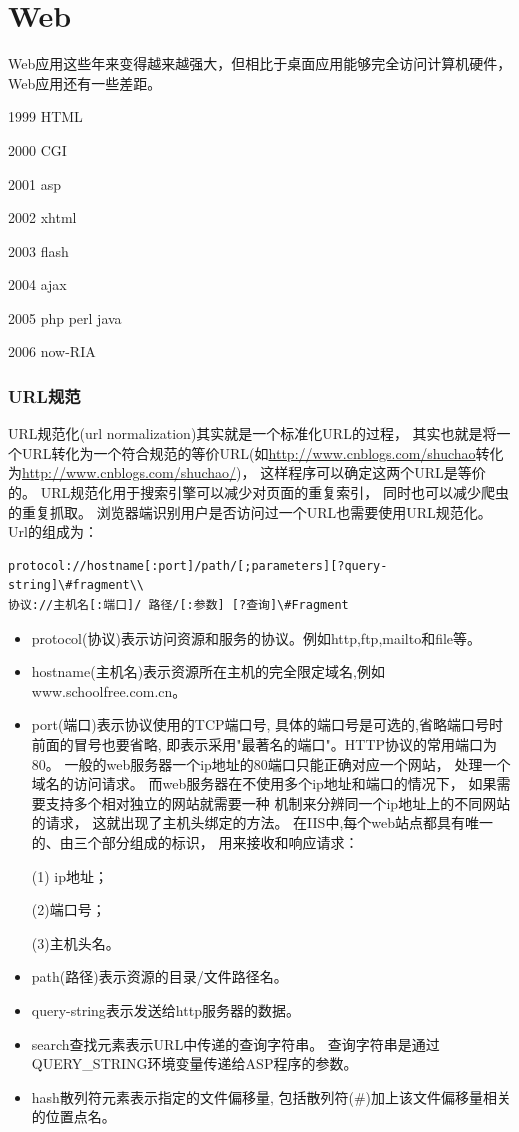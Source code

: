 \documentclass{book}
\begin{document}
\chapter{Web}

Web应用这些年来变得越来越强大，但相比于桌面应用能够完全访问计算机硬件，Web应用还有一些差距。

1999 HTML

2000 CGI

2001 asp

2002 xhtml

2003 flash

2004 ajax

2005 php perl java

2006 now-RIA

\clearpage
\mbox{}         
\clearpage

\subsection{URL规范}

URL规范化(url normalization)其实就是一个标准化URL的过程，
其实也就是将一个URL转化为一个符合规范的等价URL(如\url{http://www.cnblogs.com/shuchao}转化为\url{http://www.cnblogs.com/shuchao/})，
这样程序可以确定这两个URL是等价的。
URL规范化用于搜索引擎可以减少对页面的重复索引，
同时也可以减少爬虫的重复抓取。
浏览器端识别用户是否访问过一个URL也需要使用URL规范化。
Url的组成为：

\begin{lstlisting}
protocol://hostname[:port]/path/[;parameters][?query-string]\#fragment\\
协议://主机名[:端口]/ 路径/[:参数] [?查询]\#Fragment
\end{lstlisting}

\begin{itemize}
\item{protocol(协议)表示访问资源和服务的协议。例如http,ftp,mailto和file等。}
\item{hostname(主机名)表示资源所在主机的完全限定域名,例如www.schoolfree.com.cn。}
\item{port(端口)表示协议使用的TCP端口号,
具体的端口号是可选的,省略端口号时前面的冒号也要省略,
即表示采用"最著名的端口"。HTTP协议的常用端口为80。
一般的web服务器一个ip地址的80端口只能正确对应一个网站，
处理一个域名的访问请求。
而web服务器在不使用多个ip地址和端口的情况下，
如果需要支持多个相对独立的网站就需要一种
机制来分辨同一个ip地址上的不同网站的请求，
这就出现了主机头绑定的方法。
在IIS中,每个web站点都具有唯一的、由三个部分组成的标识，
用来接收和响应请求：

(1) ip地址；

(2)端口号；

(3)主机头名。}
\item{path(路径)表示资源的目录/文件路径名。}
\item{query-string表示发送给http服务器的数据。}
\item{search查找元素表示URL中传递的查询字符串。
查询字符串是通过QUERY\_STRING环境变量传递给ASP程序的参数。}
\item{hash散列符元素表示指定的文件偏移量,
包括散列符(\#)加上该文件偏移量相关的位置点名。}
\end{itemize}
\end{document}
